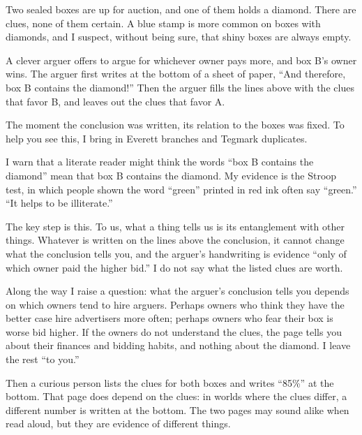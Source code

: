 
Two sealed boxes are up for auction, and one of them holds a diamond. There are clues, none of them certain. A blue stamp is more common on boxes with diamonds, and I suspect, without being sure, that shiny boxes are always empty.

A clever arguer offers to argue for whichever owner pays more, and box B's owner wins. The arguer first writes at the bottom of a sheet of paper, ``And therefore, box B contains the diamond!'' Then the arguer fills the lines above with the clues that favor B, and leaves out the clues that favor A.

The moment the conclusion was written, its relation to the boxes was fixed. To help you see this, I bring in Everett branches and Tegmark duplicates. 

I warn that a literate reader might think the words ``box B contains the diamond'' mean that box B contains the diamond. My evidence is the Stroop test, in which people shown the word ``green'' printed in red ink often say ``green.''  ``It helps to be illiterate.''

The key step is this. To us, what a thing tells us is its entanglement with other things. Whatever is written on the lines above the conclusion, it cannot change what the conclusion tells you, and the arguer's handwriting is evidence ``only of which owner paid the higher bid.'' I do not say what the listed clues are worth. 

Along the way I raise a question: what the arguer's conclusion tells you depends on which owners tend to hire arguers. Perhaps owners who think they have the better case hire advertisers more often; perhaps owners who fear their box is worse bid higher. If the owners do not understand the clues, the page tells you about their finances and bidding habits, and nothing about the diamond. I leave the rest ``to you.''

Then a curious person lists the clues for both boxes and writes ``85\%'' at the bottom. That page does depend on the clues: in worlds where the clues differ, a different number is written at the bottom. The two pages may sound alike when read aloud, but they are evidence of different things.

